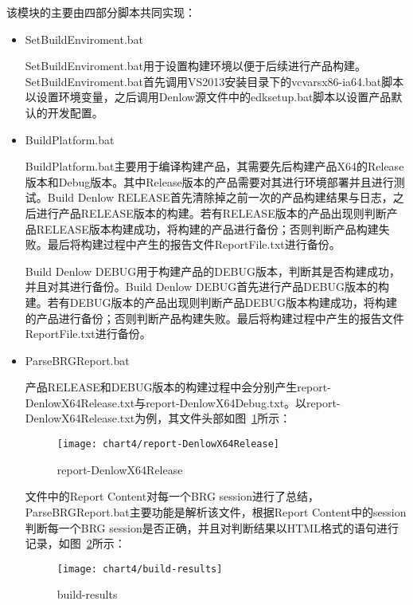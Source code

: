 		该模块的主要由四部分脚本共同实现：
		
		\begin{itemize}
			\item SetBuildEnviroment.bat
				
				SetBuildEnviroment.bat用于设置构建环境以便于后续进行产品构建。SetBuildEnviroment.bat首先调用VS2013安装目录下的vcvarsx86-ia64.bat脚本以设置环境变量，之后调用Denlow源文件中的edksetup.bat脚本以设置产品默认的开发配置。
			\item BuildPlatform.bat
				
				BuildPlatform.bat主要用于编译构建产品，其需要先后构建产品X64的Release版本和Debug版本。其中Release版本的产品需要对其进行环境部署并且进行测试。Build Denlow RELEASE首先清除掉之前一次的产品构建结果与日志，之后进行产品RELEASE版本的构建。若有RELEASE版本的产品出现则判断产品RELEASE版本构建成功，将构建的产品进行备份；否则判断产品构建失败。最后将构建过程中产生的报告文件ReportFile.txt进行备份。
			
				Build Denlow DEBUG用于构建产品的DEBUG版本，判断其是否构建成功，并且对其进行备份。Build Denlow DEBUG首先进行产品DEBUG版本的构建。若有DEBUG版本的产品出现则判断产品DEBUG版本构建成功，将构建的产品进行备份；否则判断产品构建失败。最后将构建过程中产生的报告文件ReportFile.txt进行备份。
			\item ParseBRGReport.bat
				
				产品RELEASE和DEBUG版本的构建过程中会分别产生report-DenlowX64Release.txt与report-DenlowX64Debug.txt。以report-DenlowX64Release.txt为例，其文件头部如图~\ref{fig:report-DenlowX64Release}所示：
				
				\begin{figure}[H] %
					\centering
					\texttt{[image: chart4/report-DenlowX64Release]}
					\caption{report-DenlowX64Release}
					\label{fig:report-DenlowX64Release}
				\end{figure}
				
				文件中的Report Content对每一个BRG session进行了总结，ParseBRGReport.bat主要功能是解析该文件，根据Report Content中的session判断每一个BRG session是否正确，并且对判断结果以HTML格式的语句进行记录，如图~\ref{fig:build-results}所示：
				
				\begin{figure}[H] %
					\centering
					\texttt{[image: chart4/build-results]}
					\caption{build-results}
					\label{fig:build-results}
				\end{figure}
				

\end{itemize}
